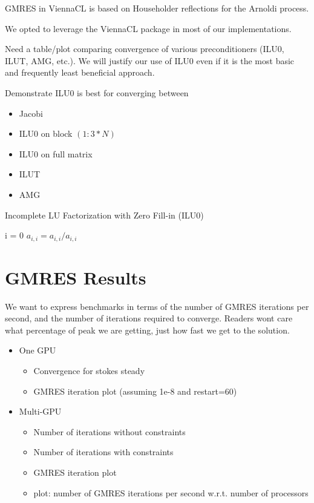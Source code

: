 GMRES in ViennaCL is based on Householder reflections for the Arnoldi process. 

We opted to leverage the ViennaCL package in most of our implementations. 

Need a table/plot comparing convergence of various preconditioners (ILU0, ILUT, AMG, etc.). We will justify our use of ILU0 even if it is the most basic and frequently least beneficial approach.

Demonstrate ILU0 is best for converging between 
\begin{itemize}
\item Jacobi
\item ILU0 on block $(1:3*N)$
\item ILU0 on full matrix
\item ILUT
\item AMG 
\end{itemize} 

\begin{algorithm}                     
\caption{Incomplete LU Factorization with Zero Fill-in (ILU0)}         
\label{alg:gmres}                        
\begin{algorithmic}[1]                  
    \For i = 0
    \State $a_{i,i} = a_{i,i} / a_{i,i}$
    \EndFor
\end{algorithmic}
\end{algorithm}

\section{GMRES Results}

We want to express benchmarks in terms of the number of GMRES iterations per second, and the number of iterations required to converge. Readers wont care what percentage of peak we are getting, just how fast we get to the solution. 

\begin{itemize} 
\item One GPU
\begin{itemize} 
	\item {\color{blue} Convergence for stokes steady}  
	\item {\color{blue} GMRES iteration plot (assuming 1e-8 and restart=60)} 
\end{itemize} 
\item Multi-GPU
	\begin{itemize} 
		\item Number of iterations without constraints
		\item Number of iterations with constraints
		\item GMRES iteration plot
		\item plot: number of GMRES iterations per second w.r.t. number of processors
	\end{itemize} 
\end{itemize} 


